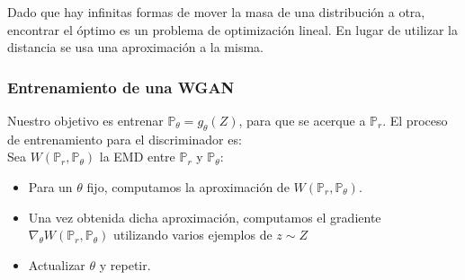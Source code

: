 \documentclass[spanish]{report}
\begin{document}
\newpage
	Dado que hay infinitas formas de mover la masa de una distribución a otra, encontrar el óptimo es un problema de optimización lineal. En lugar de utilizar la distancia se usa una aproximación a la misma.
	









\subsubsection{Entrenamiento de una WGAN}

Nuestro objetivo es entrenar $\mathbb{P}_{\theta} = g_{\theta}(Z)$, para que se acerque a $\mathbb{P}_{r}$. El proceso de entrenamiento para el discriminador es:\\

\noindent Sea $W(\mathbb{P}_{r}, \mathbb{P}_{\theta})$ la EMD entre $\mathbb{P}_{r}$ y $\mathbb{P}_{\theta}$:

\begin{itemize}
\item Para un $\theta$ fijo, computamos la aproximación de $W(\mathbb{P}_{r}, \mathbb{P}_{\theta})$.
\item Una vez obtenida dicha aproximación, computamos el gradiente $\nabla_{\theta} W(\mathbb{P}_{r}, \mathbb{P}_{\theta})$ utilizando varios ejemplos de $z \sim Z$
\item Actualizar $\theta$ y repetir.
\end{itemize}
\end{document}
